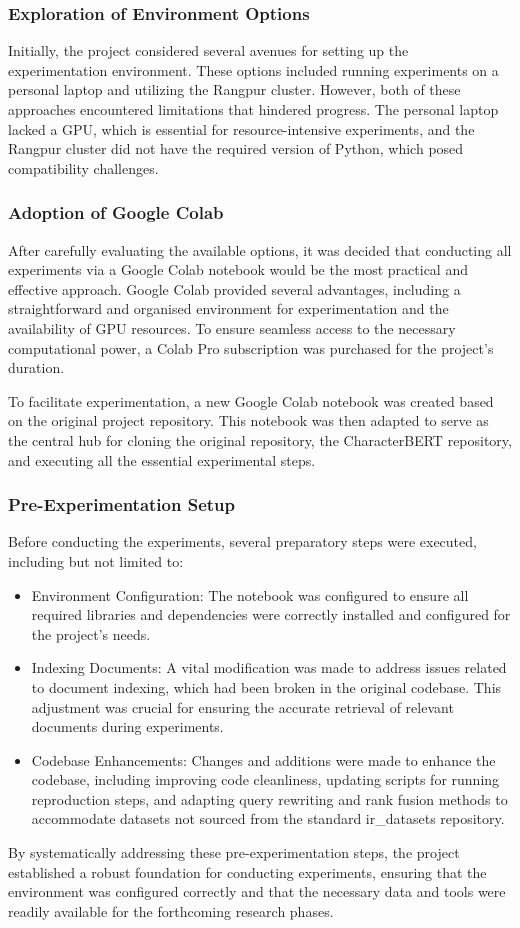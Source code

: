 \subsubsection{Exploration of Environment Options}
Initially, the project considered several avenues for setting up the experimentation environment. These options included running experiments on a personal laptop and utilizing the Rangpur cluster. However, both of these approaches encountered limitations that hindered progress. The personal laptop lacked a GPU, which is essential for resource-intensive experiments, and the Rangpur cluster did not have the required version of Python, which posed compatibility challenges.

\subsubsection{Adoption of Google Colab}
After carefully evaluating the available options, it was decided that conducting all experiments via a Google Colab notebook would be the most practical and effective approach. Google Colab provided several advantages, including a straightforward and organised environment for experimentation and the availability of GPU resources. To ensure seamless access to the necessary computational power, a Colab Pro subscription was purchased for the project's duration.

To facilitate experimentation, a new Google Colab notebook was created based on the original project repository. This notebook was then adapted to serve as the central hub for cloning the original repository, the CharacterBERT repository, and executing all the essential experimental steps.

\subsubsection{Pre-Experimentation Setup}
Before conducting the experiments, several preparatory steps were executed, including but not limited to:

\begin{itemize}
    \item Environment Configuration: The notebook was configured to ensure all required libraries and dependencies were correctly installed and configured for the project's needs.
    \item Indexing Documents: A vital modification was made to address issues related to document indexing, which had been broken in the original codebase. This adjustment was crucial for ensuring the accurate retrieval of relevant documents during experiments.
    \item Codebase Enhancements: Changes and additions were made to enhance the codebase, including improving code cleanliness, updating scripts for running reproduction steps, and adapting query rewriting and rank fusion methods to accommodate datasets not sourced from the standard ir\_datasets repository.
\end{itemize}

By systematically addressing these pre-experimentation steps, the project established a robust foundation for conducting experiments, ensuring that the environment was configured correctly and that the necessary data and tools were readily available for the forthcoming research phases.
